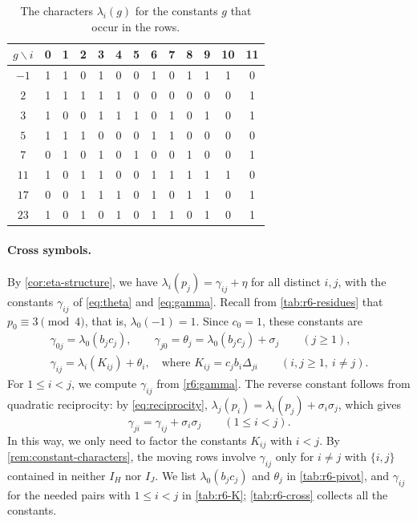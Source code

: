 \begin{table}[htbp]
\centering
\caption{The characters $\lambda_i(g)$ for the constants $g$ that occur in the rows.}
\label{tab:r6-chars}
\begin{tabular}{c*{12}{c}}
\toprule
$g\backslash i$ & 0 & 1 & 2 & 3 & 4 & 5 & 6 & 7 & 8 & 9 & 10 & 11\\
\midrule
$-1$ & 1 & 1 & 0 & 1 & 0 & 0 & 1 & 0 & 1 & 1 & 1 & 0 \\
$2$ & 1 & 1 & 1 & 1 & 1 & 0 & 0 & 0 & 0 & 0 & 0 & 1 \\
$3$ & 1 & 0 & 0 & 1 & 1 & 1 & 0 & 1 & 0 & 1 & 0 & 1 \\
$5$ & 1 & 1 & 1 & 0 & 0 & 0 & 1 & 1 & 0 & 0 & 0 & 0 \\
$7$ & 0 & 1 & 0 & 1 & 0 & 1 & 0 & 0 & 1 & 0 & 0 & 1 \\
$11$ & 1 & 0 & 1 & 1 & 0 & 0 & 1 & 1 & 1 & 1 & 1 & 0 \\
$17$ & 0 & 0 & 1 & 1 & 1 & 0 & 1 & 0 & 1 & 1 & 0 & 1 \\
$23$ & 1 & 0 & 1 & 0 & 1 & 0 & 1 & 1 & 0 & 1 & 0 & 1 \\
\bottomrule
\end{tabular}
\end{table}

\paragraph{Cross symbols.} By \cref{cor:eta-structure}, we have $\lambda_i(p_j)=\gamma_{ij}+\eta$ for all distinct $i,j$, with the constants $\gamma_{ij}$ of \eqref{eq:theta} and \eqref{eq:gamma}. Recall from \cref{tab:r6-residues} that $p_0\equiv3\pmod4$, that is, $\lambda_0(-1)=1$. Since $c_0=1$, these constants are
\begin{equation}\label{r6:gamma}
\begin{gathered}
\gamma_{0j}=\lambda_0(b_jc_j),\qquad \gamma_{j0}=\theta_j=\lambda_0(b_jc_j)+\sigma_j\qquad(j\ge1),\\
\gamma_{ij}=\lambda_i(K_{ij})+\theta_i,\quad\text{where } K_{ij}=c_jb_i\Delta_{ji}\qquad(i,j\ge1,\ i\ne j).
\end{gathered}
\end{equation}
For $1\le i<j$, we compute $\gamma_{ij}$ from \eqref{r6:gamma}. The reverse constant follows from quadratic reciprocity: by \eqref{eq:reciprocity}, $\lambda_j(p_i)=\lambda_i(p_j)+\sigma_i\sigma_j$, which gives
\begin{equation}\label{r6:reverse}
\gamma_{ji}=\gamma_{ij}+\sigma_i\sigma_j\qquad(1\le i<j).
\end{equation}
In this way, we only need to factor the constants $K_{ij}$ with $i<j$. By \cref{rem:constant-characters}, the moving rows involve $\gamma_{ij}$ only for $i\ne j$ with $\{i,j\}$ contained in neither $I_H$ nor $I_J$. We list $\lambda_0(b_jc_j)$ and $\theta_j$ in \cref{tab:r6-pivot}, and $\gamma_{ij}$ for the needed pairs with $1\le i<j$ in \cref{tab:r6-K}; \cref{tab:r6-cross} collects all the constants.

